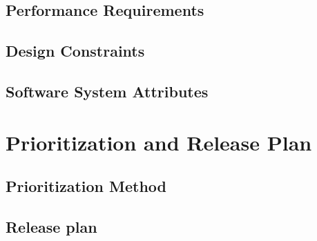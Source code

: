 \documentclass[onecolumn, draftclsnofoot,10pt, compsoc]{IEEEtran}
\begin{document}
    
    
    \subsection{Performance Requirements}
    \subsection{Design Constraints}
    \subsection{Software System Attributes}


\section{Prioritization and Release Plan}
    \subsection{Prioritization Method}
    \subsection{Release plan}


% 
%
\end{document}
